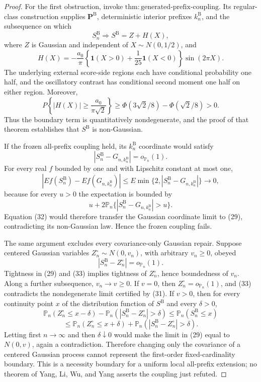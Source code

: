 \documentclass{article}
\begin{document}
\begin{proof}
For the first obstruction, invoke \(\mathrm{thm:generated\text{-}prefix\text{-}coupling}\).  Its regular-class construction supplies \(\mathbf P^{\mathrm B}\), deterministic interior prefixes \(k_n^{\mathrm B}\), and the subsequence on which
\[
 S_n^{\mathrm B}\Rightarrow S^{\mathrm B}=Z+H(X),
\tag{29}
\]
where \(Z\) is Gaussian and independent of \(X\sim N(0,1/2)\), and
\[
 H(X)=-\frac{a_0}{\pi}
 \left\{\mathbf1(X>0)+\frac1{25}\mathbf1(X<0)\right\}
 \sin(2\pi X).
\tag{30}
\]
The underlying external score-side regions each have conditional probability one half, and the oscillatory contrast has conditional second moment one half on either region.  Moreover,
\[
 P\left\{|H(X)|\geq\frac{a_0}{\pi\sqrt2}\right\}
 \geq\Phi(3\sqrt2/8)-\Phi(\sqrt2/8)>0.
\tag{31}
\]
Thus the boundary term is quantitatively nondegenerate, and the proof of that theorem establishes that \(S^{\mathrm B}\) is non-Gaussian.

If the frozen all-prefix coupling held, its \(k_n^{\mathrm B}\) coordinate would satisfy
\[
 |S_n^{\mathrm B}-G_{n,k_n^{\mathrm B}}|=o_{\mathbb P_n}(1).
\tag{32}
\]
For every real \(f\) bounded by one and with Lipschitz constant at most one,
\[
 |E f(S_n^{\mathrm B})-E f(G_{n,k_n^{\mathrm B}})|
 \leq E\min\{2,|S_n^{\mathrm B}-G_{n,k_n^{\mathrm B}}|\}\longrightarrow0,
\]
because for every \(u>0\) the expectation is bounded by
\[
 u+2\mathbb P_n\{|S_n^{\mathrm B}-G_{n,k_n^{\mathrm B}}|>u\}.
\]
Equation (32) would therefore transfer the Gaussian coordinate limit to (29), contradicting its non-Gaussian law.  Hence the frozen coupling fails.

The same argument excludes every covariance-only Gaussian repair.  Suppose centered Gaussian variables \(Z_n^{\circ}\sim N(0,v_n)\), with arbitrary \(v_n\geq0\), obeyed
\[
 |S_n^{\mathrm B}-Z_n^{\circ}|=o_{\mathbb P_n}(1).
\tag{33}
\]
Tightness in (29) and (33) implies tightness of \(Z_n^{\circ}\), hence boundedness of \(v_n\).  Along a further subsequence, \(v_n\to v\geq0\).  If \(v=0\), then \(Z_n^{\circ}=o_{\mathbb P_n}(1)\), and (33) contradicts the nondegenerate limit certified by (31).  If \(v>0\), then for every continuity point \(x\) of the distribution function of \(S^{\mathrm B}\) and every \(\delta>0\),
\[
 \mathbb P_n(Z_n^{\circ}\leq x-\delta)
 -\mathbb P_n(|S_n^{\mathrm B}-Z_n^{\circ}|>\delta)
 \leq\mathbb P_n(S_n^{\mathrm B}\leq x)
\]
\[
 \leq\mathbb P_n(Z_n^{\circ}\leq x+\delta)
 +\mathbb P_n(|S_n^{\mathrm B}-Z_n^{\circ}|>\delta).
\]
Letting first \(n\to\infty\) and then \(\delta\downarrow0\) would make the limit in (29) equal to \(N(0,v)\), again a contradiction.  Therefore changing only the covariance of a centered Gaussian process cannot represent the first-order fixed-cardinality boundary.  This is a necessity boundary for a uniform local all-prefix extension; no theorem of Yang, Li, Wu, and Yang asserts the coupling just refuted.


\end{proof}
\end{document}
